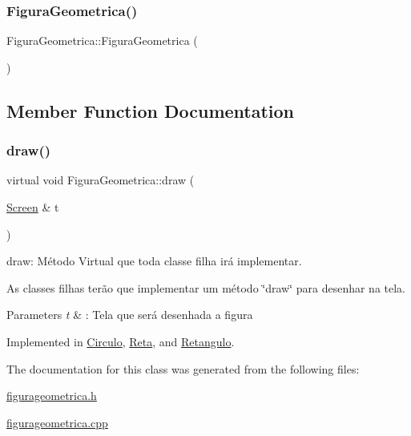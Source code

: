 \subsubsection{\texorpdfstring{Figura\+Geometrica()}{FiguraGeometrica()}}
{\footnotesize\ttfamily Figura\+Geometrica\+::\+Figura\+Geometrica (\begin{DoxyParamCaption}{ }\end{DoxyParamCaption})}



\subsection{Member Function Documentation}
\mbox{\label{class_figura_geometrica_a8ee8dedc060b6059a805ea091aef2c41}} 
\subsubsection{\texorpdfstring{draw()}{draw()}}
{\footnotesize\ttfamily virtual void Figura\+Geometrica\+::draw (\begin{DoxyParamCaption}\item[{\hyperlink{class_screen}{Screen} \&}]{t }\end{DoxyParamCaption})\hspace{0.3cm}{\ttfamily [pure virtual]}}



draw\+: Método Virtual que toda classe filha irá implementar. 

As classes filhas terão que implementar um método \char`\"{}draw\char`\"{} para desenhar na tela. 
\begin{DoxyParams}{Parameters}
{\em t} & \+: Tela que será desenhada a figura \\
\hline
\end{DoxyParams}


Implemented in \hyperlink{class_circulo_a593787d6e0618c2eded23e8839e7bea6}{Circulo}, \hyperlink{class_reta_ac2e9805183cd474b62bffd8b032cd780}{Reta}, and \hyperlink{class_retangulo_ac088dd6d3f4f3d3f80363a868c2e74f1}{Retangulo}.



The documentation for this class was generated from the following files\+:\begin{DoxyCompactItemize}
\item 
\hyperlink{figurageometrica_8h}{figurageometrica.\+h}\item 
\hyperlink{figurageometrica_8cpp}{figurageometrica.\+cpp}\end{DoxyCompactItemize}
